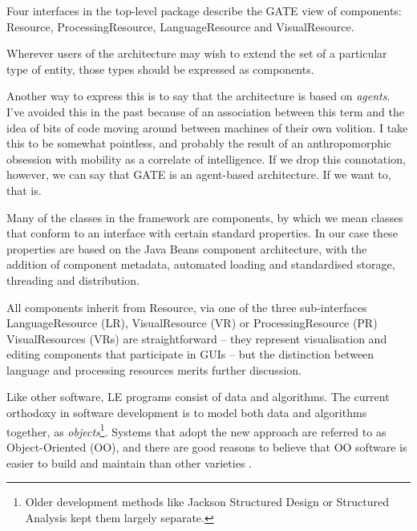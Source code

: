 Four interfaces in the top-level package describe the GATE view of
components:
Resource, ProcessingResource, LanguageResource and VisualResource.





Wherever users of the architecture may wish to extend the set of a
particular type of entity, those types should be expressed as components.

Another way to express this is to say that the architecture is based on
{\em agents}. I've avoided this in the past because of an association
between this term and the idea of bits of code moving around between
machines of their own volition. I take this to be somewhat pointless, and
probably the result of an anthropomorphic obsession with mobility as a
correlate of intelligence. If we drop this connotation, however, we can
say that GATE is an agent-based architecture. If we want to, that is.



Many of the classes in the framework are components, by which we mean
classes that conform to an interface with certain standard properties. In
our case these properties are based on the Java Beans component
architecture, with the addition of component metadata, automated loading
and standardised storage, threading and distribution.

All components inherit from Resource, via one of the three sub-interfaces
LanguageResource (LR), VisualResource (VR) or ProcessingResource (PR)
VisualResources (VRs) are straightforward -- they represent visualisation and
editing components that participate in GUIs -- but the distinction between
language and processing resources merits further discussion.

Like other software, LE programs consist of data and algorithms. The
current orthodoxy in software development is to model both data and
algorithms together, as {\it objects}\footnote{Older
development methods like Jackson Structured Design \cite{Jac75}
or Structured Analysis \cite{You89} kept them
largely separate.}. Systems that adopt the new approach are
referred to as Object-Oriented (OO), and there are good reasons to believe
that OO software is easier to build and maintain than other varieties
\cite{Boo94,You96}.

